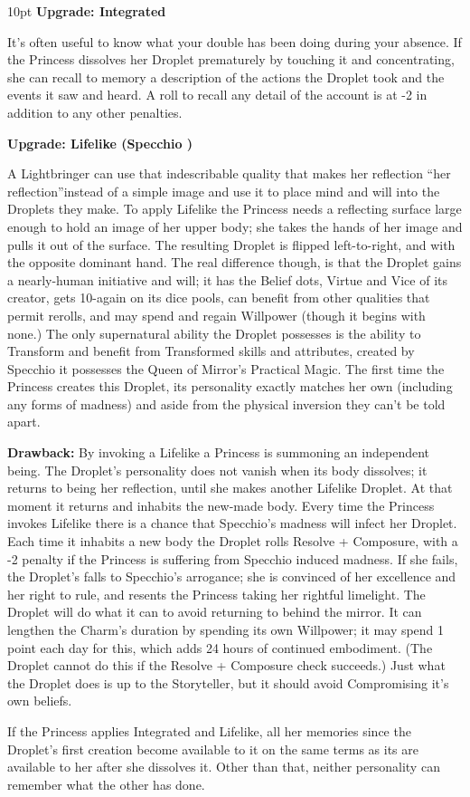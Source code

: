 \begin{myindentpar}{10pt} \textbf{Upgrade: Integrated}

It's often useful to know what your double has been doing during your absence. If the Princess dissolves her Droplet prematurely by touching it and concentrating, she can recall to memory a description of the actions the Droplet took and the events it saw and heard. A roll to recall any detail of the account is at -2 in addition to any other penalties.

\textbf{Upgrade: Lifelike (Specchio \textbullet\textbullet\textbullet)}

A Lightbringer can use that indescribable quality that makes her reflection \textquotedblleft her reflection\textquotedblright instead of a simple image and use it to place mind and will into the Droplets they make. To apply Lifelike the Princess needs a reflecting surface large enough to hold an image of her upper body; she takes the hands of her image and pulls it out of the surface. The resulting Droplet is flipped left-to-right, and with the opposite dominant hand. The real difference though, is that the Droplet gains a nearly-human initiative and will; it has the Belief dots, Virtue and Vice of its creator, gets 10-again on its dice pools, can benefit from other qualities that permit rerolls, and may spend and regain Willpower (though it begins with none.) The only supernatural ability the Droplet possesses is the ability to Transform and benefit from Transformed skills and attributes, created by Specchio it possesses the Queen of Mirror's Practical Magic. The first time the Princess creates this 
Droplet, its personality exactly matches her own (including any forms of madness) and aside from the physical inversion they can't be told apart.

\textbf{Drawback:} By invoking a Lifelike a Princess is summoning an independent being. The Droplet's personality does not vanish when its body dissolves; it returns to being her reflection, until she makes another Lifelike Droplet. At that moment it returns and inhabits the new-made body. Every time the Princess invokes Lifelike there is a chance that Specchio's madness will infect her Droplet. Each time it inhabits a new body the Droplet rolls Resolve + Composure, with a -2 penalty if the Princess is suffering from Specchio induced madness. If she fails, the Droplet's falls to Specchio's arrogance; she is convinced of her excellence and her right to rule, and resents the Princess taking her rightful limelight. The Droplet will do what it can to avoid returning to behind the mirror. It can lengthen the Charm's duration by spending its own Willpower; it may spend 1 point each day for this, which adds 24 hours of continued embodiment. (The Droplet cannot do this if the Resolve + Composure check succeeds.) 
Just what the Droplet does is up to the Storyteller, but it should avoid Compromising it's own beliefs.

If the Princess applies Integrated and Lifelike, all her memories since the Droplet's first creation become available to it on the same terms as its are available to her after she dissolves it. Other than that, neither personality can remember what the other has done.\end{myindentpar}

